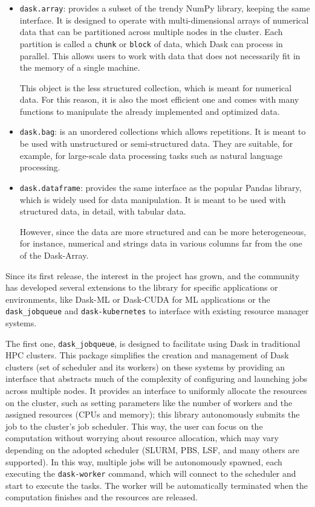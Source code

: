 \begin{itemize}
  \itemsep0em
  \item \texttt{dask.array}: provides a subset of the trendy NumPy library,
    keeping the same interface.
    It is designed to operate with multi-dimensional arrays of numerical data
    that can be partitioned across multiple nodes in the cluster.
    Each partition is called a \texttt{chunk} or \texttt{block} of data, which
    Dask can process in parallel.
    This allows users to work with data that does not necessarily fit in the memory
    of a single machine\cite{daskdoc-array}.

    This object is the less structured collection, which is meant for numerical data.
    For this reason, it is also the most efficient one and comes with many
    functions to manipulate the already implemented and optimized data.
  \item \texttt{dask.bag}: is an unordered collections which allows repetitions.
    It is meant to be used with unstructured or semi-structured data.
    They are suitable, for example, for large-scale data processing tasks such
    as natural language processing.
  \item \texttt{dask.dataframe}: provides the same interface as the popular
    Pandas library, which is widely used for data manipulation.
    It is meant to be used with structured data, in detail, with tabular
    data\cite{daskdoc-dataframe}.

    However, since the data are more structured and can be more heterogeneous,
    for instance, numerical and strings data in various columns far from the one of
    the Dask-Array\cite{dask2015}.
\end{itemize}

Since its first release, the interest in the project has grown, and the
community has developed several extensions to the library for specific
applications or environments, like Dask-ML or Dask-CUDA for ML applications or
the \texttt{dask\_jobqueue} and \texttt{dask-kubernetes} to interface with
existing resource manager systems.

The first one, \texttt{dask\_jobqueue}, is designed to facilitate using Dask in
traditional HPC clusters.
This package simplifies the creation and management of Dask clusters (set of
scheduler and its workers) on these systems by providing an interface that
abstracts much of the complexity of configuring and launching jobs across
multiple nodes.
It provides an interface to uniformly allocate the resources on the cluster,
such as setting parameters like the number of workers and the assigned resources
(CPUs and memory); this library autonomously submits the job to the cluster's
job scheduler.
This way, the user can focus on the computation without worrying about resource
allocation, which may vary depending on the adopted scheduler (SLURM, PBS, LSF,
and many others are supported).
In this way, multiple jobs will be autonomously spawned, each executing the
\texttt{dask-worker} command, which will connect to the scheduler and start to
execute the tasks.
The worker will be automatically terminated when the computation finishes and
the resources are released.

